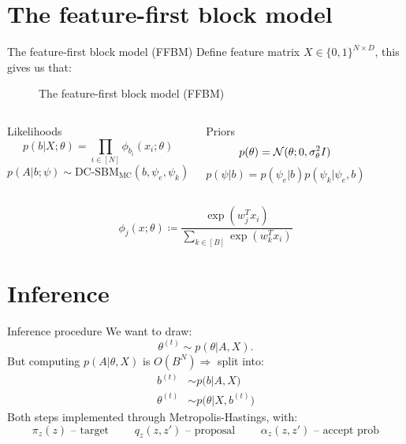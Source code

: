 \documentclass{beamer}
\newcommand{\Gaussian}{\mathcal{N}}
\begin{document}
\section{The feature-first block model}

	\begin{frame}{The feature-first block model (FFBM)}
		Define feature matrix $X \in \{0, 1\}^{N \times D}$, this gives us that:
		\begin{figure}[!h]
			\centering
			\caption{The feature-first block model (FFBM)}
			\label{fig:ffbm}
		\end{figure}
	
		\begin{columns}
			\begin{block}{Likelihoods}
				$$p(b|X; \theta) = \prod_{i \in [N]} \phi_{b_i} (x_i; \theta)$$
				$$p(A|b; \psi) \sim \textrm{DC-SBM}_{\textrm{MC}} (b, \psi_e, \psi_k)$$
			\end{block}
		
			\begin{block}{Priors}
				$$p(\theta) = \Gaussian(\theta;0, \sigma_\theta^2 I)\vspace{4mm}$$
				$$p(\psi | b) = p(\psi_e | b) p(\psi_k | \psi_e, b)$$
			\end{block}
		\end{columns}
	
		\vspace{5mm}
		$$\phi_{j}(x; \theta) \coloneqq \frac{\exp (w_j^T x_i)}{\sum_{k \in [B]} \exp (w_k^T x_i) }$$
	\end{frame}

	\section{Inference}
	\begin{frame}{Inference procedure}
		We want to draw:
		$$\theta^{(t)} \sim p(\theta| A, X).$$
		But computing $p(A| \theta, X)$ is $O(B^N) \Rightarrow$  split into:
		\begin{align*}
			b^{(t)} &\sim p \Big( b| A, X \Big) \\
			\theta^{(t)} &\sim p \Big( \theta| X, b^{(t)} \Big)
		\end{align*}
		Both steps implemented through Metropolis-Hastings, with:
		$$\pi_z(z) \textrm{ -- target } \qquad q_z(z, z') \textrm{ -- proposal } \qquad \alpha_z(z, z') \textrm{ -- accept prob}$$		
	\end{frame}
	
\end{document}
